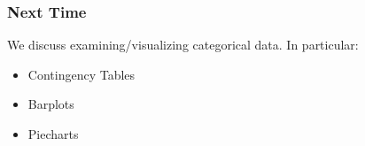 \documentclass[handout]{beamer}
\begin{document}
\begin{frame}[fragile]
\frametitle{Next Time}

We discuss examining/visualizing categorical data.  In particular:

\begin{itemize}
\item Contingency Tables
\item Barplots
\item Piecharts 
\end{itemize}


\end{frame}
\end{document}
